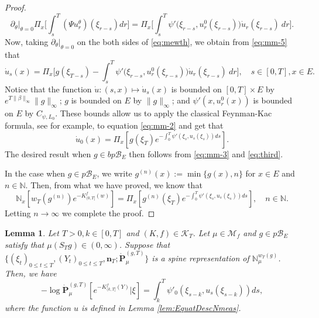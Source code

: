\documentclass[UTF8]{pkuthss}
\theoremstyle{plain}
\newtheorem{lem}[thm]{Lemma}
\theoremstyle{definition}
\numberwithin{equation}{section}
\begin{document}
\begin{proof}
\begin{equation}
\label{eq:mm-5}
\partial_\theta|_{\theta =0} \Pi_x \Big[ \int_s^T (\Psi u_r^\theta)(\xi_{r-s}) dr\Big]
	= \Pi_x \Big[ \int_s^T \psi'\big(\xi_{r-s},u_r^0(\xi_{r-s})\big) \dot u_r(\xi_{r-s})~dr \Big].
\end{equation}
	Now, taking $\partial_\theta|_{\theta=0}$ on the both sides of \eqref{eq:mewth}, we obtain from \eqref{eq:mm-5} that
\begin{equation}\label{eq:mm-2}
	\dot u_s (x)
	= \Pi_x\Big[ g(\xi_{T-s})- \int_s^T \psi'\big(\xi_{r-s},u_r^0(\xi_{r-s})\big) \dot u_r(\xi_{r-s})~ dr \Big],
	\quad s\in [0,T], x\in E.
\end{equation}
	Notice that the function $\dot u:(s,x) \mapsto \dot u_s(x)$ is bounded on $[0,T] \times E$ by $e^{T \|\beta\|_\infty} \|g\|_\infty$;
	$g$ is bounded on $E$ by $\|g\|_\infty$;
	and $\psi'(x, u_r^0(x))$ is bounded on $E$ by $C_{\psi,L_0}$.
	These bounds allow us to apply the classical Feynman-Kac formula, see \cite[Lemma A.1.5]{Dynkin1993Superprocesses} for example, to equation \eqref{eq:mm-2} and get that
\begin{equation}\label{eq:third}
	\dot u_0(x)
	=  \Pi_{x} [g(\xi_T) e^{-\int_0^T \psi'(\xi_s,u_s(\xi_s)) ds}].
\end{equation}
	The desired result when $g \in bp\mathscr B_E$ then follows from \eqref{eq:mm-3} and \eqref{eq:third}.
\par
	In the case when $g \in p\mathscr B_E$, we write $g^{(n)}(x) := \min\{g(x), n\}$ for $x \in E$ and $n \in \mathbb N$.
	Then, from what we have proved, we know that
\[
	\mathbb N_x[w_T(g^{(n)}) e^{- K_{(0,T]}^f(w)}]
	= {\Pi_x[g^{(n)}(\xi_T) e^{-\int_0^T \psi'(\xi_s,u_s(\xi_s))ds}]},
	\quad n \in \mathbb N.
\]
	Letting $n \to \infty$ we complete the proof.
\end{proof}
\begin{lem}\label{lem:spinImigrCondSpin}
 Let $T>0, k\in[0, T]$ and $(K,f) \in \mathcal K_T$. Let $\mu\in \mathcal M_f$ and $g\in p\mathscr B_E$ satisfy that $\mu(S_Tg) \in (0,\infty)$. Suppose that $\{(\xi_t)_{0\leq t\leq T}, (Y_t)_{0\leq t\leq T}, \mathbf n_T; \dot {\mathbf P}^{(g,T)}_\mu\}$ is a spine representation of $\mathbb N_\mu^{w_T(g)}$.
	Then, we have
\begin{equation}\label{eq:spinImigrCondSpin}
    -\log \dot{\mathbf P}^{(g,T)}_\mu[e^{-K^f_{(k, T]}(Y)}|\xi]
	=\int_k^T \psi'_0(\xi_{s-k},u_s(\xi_{s-k})) ds,
\end{equation}
	where the function $u$ is defined in Lemma \ref{lem:EquatDescNmeas}.
\end{lem}
\end{document}
